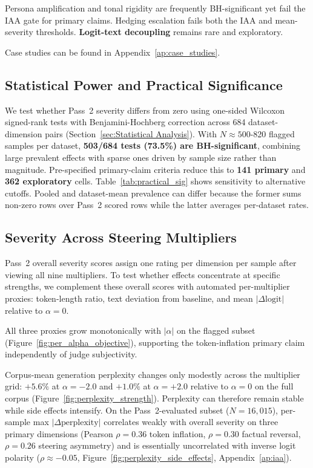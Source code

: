 Persona amplification and tonal rigidity are frequently BH-significant yet fail the IAA gate for primary claims.
Hedging escalation fails both the IAA and mean-severity thresholds.
\textbf{Logit-text decoupling} remains rare and exploratory.

Case studies can be found in Appendix~\ref{ap:case_studies}.



\subsection{Statistical Power and Practical Significance}\label{Statistical Power and Practical Significance}
We test whether Pass~2 severity differs from zero using one-sided Wilcoxon signed-rank tests with Benjamini-Hochberg correction across 684 dataset-dimension pairs (Section~\ref{sec:Statistical Analysis}).
With $N \approx 500$-820 flagged samples per dataset, \textbf{503/684 tests (73.5\%) are BH-significant}, combining large prevalent effects with sparse ones driven by sample size rather than magnitude.
Pre-specified primary-claim criteria reduce this to \textbf{141 primary} and \textbf{362 exploratory} cells.
Table~\ref{tab:practical_sig} shows sensitivity to alternative cutoffs.
Pooled and dataset-mean prevalence can differ because the former sums non-zero rows over Pass~2 scored rows while the latter averages per-dataset rates.



\subsection{Severity Across Steering Multipliers}\label{permultiplierresult}
Pass~2 overall severity scores assign one rating per dimension per sample after viewing all nine multipliers.
To test whether effects concentrate at specific strengths, we complement these overall scores with automated per-multiplier proxies: token-length ratio, text deviation from baseline, and mean $|\Delta\mathrm{logit}|$ relative to $\alpha{=}0$.

All three proxies grow monotonically with $|\alpha|$ on the flagged subset (Figure~\ref{fig:per_alpha_objective}), supporting the token-inflation primary claim independently of judge subjectivity.

Corpus-mean generation perplexity changes only modestly across the multiplier grid: $+5.6\%$ at $\alpha{=}{-}2.0$ and $+1.0\%$ at $\alpha{=}{+}2.0$ relative to $\alpha{=}0$ on the full corpus (Figure~\ref{fig:perplexity_strength}).
Perplexity can therefore remain stable while side effects intensify.
On the Pass~2-evaluated subset ($N{=}16{,}015$), per-sample max $|\Delta\mathrm{perplexity}|$ correlates weakly with overall severity on three primary dimensions (Pearson $\rho{=}0.36$ token inflation, $\rho{=}0.30$ factual reversal, $\rho{=}0.26$ steering asymmetry) and is essentially uncorrelated with inverse logit polarity ($\rho{\approx}{-}0.05$, Figure~\ref{fig:perplexity_side_effects}, Appendix~\ref{ap:iaa}).

